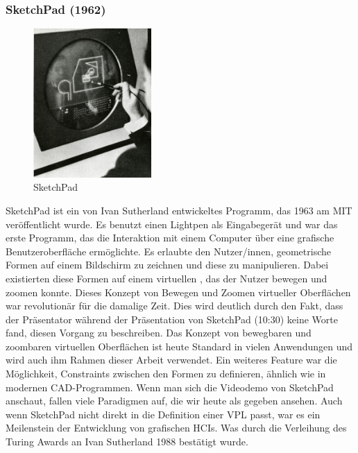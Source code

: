 \documentclass[ngerman]{article}
\begin{document}
\subsubsection{SketchPad (1962)}
\label{sec:SketchPad}
\begingroup
\setlength\intextsep{4pt}
\begin{minipage}{\linewidth}
\begin{figure}
  \centering
  \includegraphics[width=0.4\textwidth]{./graphics/sketchpad-sutherland.jpg} %
  \caption{SketchPad \cite{sutherlandSketchpad}}
\end{figure}
SketchPad ist ein von Ivan Sutherland entwickeltes Programm, das 1963 am MIT veröffentlicht wurde. 
Es benutzt einen Lightpen als Eingabegerät und war das erste Programm, das die Interaktion mit einem Computer über eine grafische Benutzeroberfläche ermöglichte. 
Es erlaubte den Nutzer/innen, geometrische Formen auf einem Bildschirm zu zeichnen und diese zu manipulieren.
  Dabei existierten diese Formen auf einem virtuellen , das der Nutzer bewegen und zoomen konnte. Dieses Konzept von Bewegen und Zoomen virtueller Oberflächen war revolutionär für die damalige Zeit.
  Dies wird deutlich durch den Fakt, dass der Präsentator während der Präsentation von SketchPad \cite{sketchpadDemo} (10:30) keine Worte fand, diesen Vorgang zu beschreiben. Das Konzept von bewegbaren und zoombaren virtuellen Oberflächen ist heute Standard in vielen Anwendungen und wird auch ihm Rahmen dieser Arbeit verwendet.
Ein weiteres Feature war die Möglichkeit, Constraints zwischen den Formen zu definieren, ähnlich wie in modernen CAD-Programmen. 
Wenn man sich die Videodemo von SketchPad anschaut, fallen viele Paradigmen auf, die wir heute als gegeben ansehen.
Auch wenn SketchPad nicht direkt in die Definition einer VPL passt, war es ein Meilenstein der Entwicklung von grafischen HCIs. Was durch die Verleihung des Turing Awards an Ivan Sutherland 1988 bestätigt wurde.
\end{minipage}
\endgroup
\end{document}

